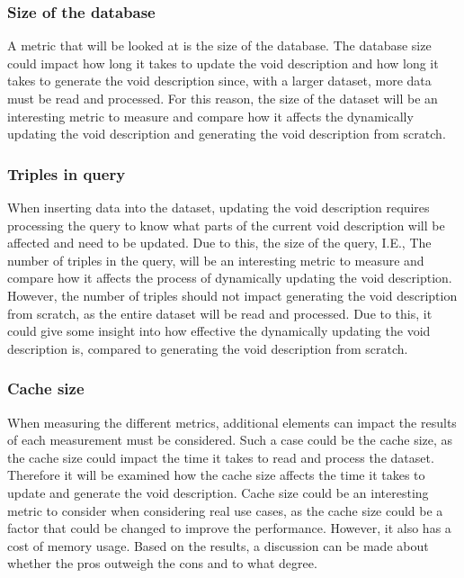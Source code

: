 \subsubsection{Size of the database}
A metric that will be looked at is the size of the database. The database size could impact how long it takes to update the void description and how long it takes to generate the void description since, with a larger dataset, more data must be read and processed. For this reason, the size of the dataset will be an interesting metric to measure and compare how it affects the dynamically updating the \gls{void} description and generating the void description from scratch.

\subsubsection{Triples in query}
When inserting data into the dataset, updating the \gls{void} description requires processing the query to know what parts of the current \gls{void} description will be affected and need to be updated. Due to this, the size of the query, I.E., The number of triples in the query, will be an interesting metric to measure and compare how it affects the process of dynamically updating the \gls{void} description. However, the number of triples should not impact generating the \gls{void} description from scratch, as the entire dataset will be read and processed. Due to this, it could give some insight into how effective the dynamically updating the \gls{void} description is, compared to generating the \gls{void} description from scratch.

\subsubsection{Cache size}
When measuring the different metrics, additional elements can impact the results of each measurement must be considered. Such a case could be the cache size, as the cache size could impact the time it takes to read and process the dataset. Therefore it will be examined how the cache size affects the time it takes to update and generate the \gls{void} description. Cache size could be an interesting metric to consider when considering real use cases, as the cache size could be a factor that could be changed to improve the performance. However, it also has a cost of memory usage. Based on the results, a discussion can be made about whether the pros outweigh the cons and to what degree.

